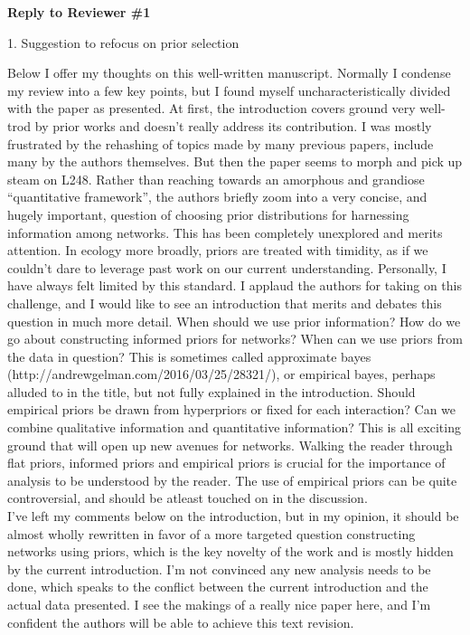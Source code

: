 \documentclass[12pt]{letter}
\newenvironment{refquote}{\bigskip \begin{it}}{\end{it}\smallskip}
\begin{document}
\newpage


{\Large \bf Reply to Reviewer \#1}

	1. Suggestion to refocus on prior selection

	\begin{refquote}
	Below I offer my thoughts on this well-written manuscript. Normally I condense my review into a few key points, but I found myself uncharacteristically divided with the paper as presented. At first, the introduction covers ground very well-trod by prior works and doesn’t really address its contribution. I was mostly frustrated by the rehashing of topics made by many previous papers, include many by the authors themselves. But then the paper seems to morph and pick up steam on L248. Rather than reaching towards an amorphous and grandiose “quantitative framework”, the authors briefly zoom into a very concise, and hugely important, question of choosing prior distributions for harnessing information among networks. This has been completely unexplored and merits attention. In ecology more broadly, priors are treated with timidity, as if we couldn’t dare to leverage past work on our current understanding. Personally, I have always felt limited by this standard. I applaud the authors for taking on this challenge, and I would like to see an introduction that merits and debates this question in much more detail. When should we use prior information? How do we go about constructing informed priors for networks? When can we use priors from the data in question? This is sometimes called approximate bayes (http://andrewgelman.com/2016/03/25/28321/), or empirical bayes, perhaps alluded to in the title, but not fully explained in the introduction. Should empirical priors be drawn from hyperpriors or fixed for each interaction? Can we combine qualitative information and quantitative information? This is all exciting ground that will open up new avenues for networks. Walking the reader through flat priors, informed priors and empirical priors is crucial for the importance of analysis to be understood by the reader. The use of empirical priors can be quite controversial, and should be atleast touched on in the discussion. \\
	I’ve left my comments below on the introduction, but in my opinion, it should be almost wholly rewritten in favor of a more targeted question constructing networks using priors, which is the key novelty of the work and is mostly hidden by the current introduction. I’m not convinced any new analysis needs to be done, which speaks to the conflict between the current introduction and the actual data presented. I see the makings of a really nice paper here, and I’m confident the authors will be able to achieve this text revision.
	\end{refquote}
\end{document}
